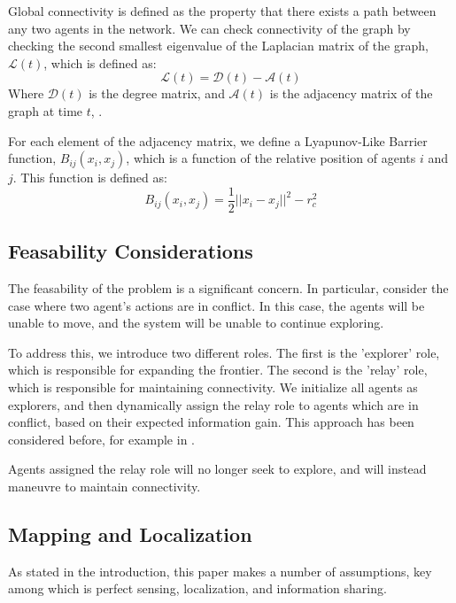 \documentclass[conference]{IEEEtran}
\begin{document}
Global connectivity is defined as the property that there exists a path between any two agents in the network. We can check connectivity
of the graph by checking the second smallest eigenvalue of the Laplacian matrix of the graph, $\mathcal L(t)$, which is defined as:
\begin{equation}
    \mathcal L(t) = \mathcal D(t) - \mathcal A(t)
\end{equation}
Where $\mathcal D(t)$ is the degree matrix, and $\mathcal A(t)$ is the adjacency matrix of the graph at time $t$, \cite{michaelMaintainingConnectivityMobile2009}.

For each element of the adjacency matrix, we define a Lyapunov-Like Barrier function, $B_{ij}(x_i, x_j)$, which is a function of the relative position of agents $i$ and $j$.
This function is defined as:
\begin{equation}
    B_{ij}(x_i, x_j) = \frac{1}{2}||x_i - x_j||^2 - r_c^2
\end{equation}

\subsection{Feasability Considerations}

The feasability of the problem is a significant concern. In particular, consider the case where two agent's actions are 
in conflict. In this case, the agents will be unable to move, and the system will be unable to continue exploring.

To address this, we introduce two different roles. The first is the 'explorer' role, which is responsible for expanding the frontier. The second is
the 'relay' role, which is responsible for maintaining connectivity. We initialize all agents as explorers, and then dynamically assign the relay role
to agents which are in conflict, based on their expected information gain. This approach has been considered before, for example in \cite{dehoogRoleBasedAutonomousMultirobot2009}.

Agents assigned the relay role will no longer seek to explore, and will instead maneuvre to maintain connectivity. 

\subsection{Mapping and Localization}
As stated in the introduction, this paper makes a number of assumptions, key among which is perfect sensing, localization, and information sharing.
\end{document}
